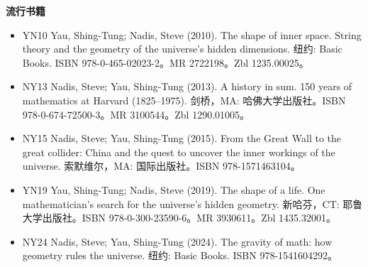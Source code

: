 \textbf{流行书籍}
\begin{itemize}
\item YN10 Yau, Shing-Tung; Nadis, Steve (2010). The shape of inner space. String theory and the geometry of the universe's hidden dimensions. 纽约: Basic Books. ISBN 978-0-465-02023-2。MR 2722198。Zbl 1235.00025。
\item NY13 Nadis, Steve; Yau, Shing-Tung (2013). A history in sum. 150 years of mathematics at Harvard (1825–1975). 剑桥，MA: 哈佛大学出版社。ISBN 978-0-674-72500-3。MR 3100544。Zbl 1290.01005。
\item NY15 Nadis, Steve; Yau, Shing-Tung (2015). From the Great Wall to the great collider: China and the quest to uncover the inner workings of the universe. 索默维尔，MA: 国际出版社。ISBN 978-1571463104。
\item YN19 Yau, Shing-Tung; Nadis, Steve (2019). The shape of a life. One mathematician's search for the universe's hidden geometry. 新哈芬，CT: 耶鲁大学出版社。ISBN 978-0-300-23590-6。MR 3930611。Zbl 1435.32001。
\item NY24 Nadis, Steve; Yau, Shing-Tung (2024). The gravity of math: how geometry rules the universe. 纽约: Basic Books. ISBN 978-1541604292。
\end{itemize}

